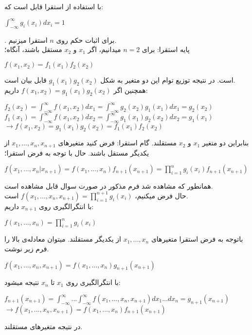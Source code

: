 با استفاده از استقرا قابل است که:
\begin{center}
	$ \int_{-\infty}^{\infty} g_i(x_i) dx_i = 1$
\end{center}
.
برای اثبات حکم روی
$ n $
استقرا میزنیم.
\\
پایه استقرا: برای
$ n = 2 $
میدانیم، اگر
$ x_1 $
و
$ x_2 $
مستقل باشند، آنگاه؛
\begin{center}
	$ f(x_1, x_2) = f_1(x_1) f_2(x_2) $
\end{center}
است. در نتیجه توزیع توام این دو متغیر به شکل 
$ g_1(x_1) g_2(x_2) $
قابل بیان است.
\\
همچنین اگر 
$ f(x_1, x_2) = g_1(x_1) g_2(x_2) $
داریم:
\begin{center}
	$ f_2(x_2) = \int_{-\infty}^{\infty} f(x_1, x_2) dx_1 = \int_{-\infty}^{\infty} g_2(x_2) g_1(x_1) dx_1 = g_2(x_2)$
	\\
	$ f_1(x_1) = \int_{-\infty}^{\infty} f(x_1, x_2) dx_2 = \int_{-\infty}^{\infty} g_1(x_1) g_2(x_2) dx_2 = g_1(x_1)$
	\\
	$ \rightarrow f(x_1, x_2) = g_1(x_1) g_2(x_2) = f_1(x_1) f_2(x_2)$
\end{center}
بنابراین دو متغیر 
$ x_1 $
و
$ x_2 $
مستقلند.
گام استقرا:
فرض کنید متغیرهای
$ x_1,..., x_n, x_{n+1} $
از یکدیگر مستقل باشند.
حال با توجه به فرض استقرا؛
\begin{center}
	$ f(x_1,..., x_n | x_{n+1}) = f(x_1,..., x_n) f_{n+1}(x_{n+1}) = \prod_{i=1}^{n} g_i(x_i) f_{n+1}(x_{n+1})$
\end{center}
همانطور که مشاهده شد فرم مذکور در صورت سوال قابل مشاهده است.
\\
حال فرض میکنیم،
$ f(x_1,..., x_n, x_{n+1}) = \prod_{i=1}^{n+1} g_i(x_i) $
است.
\\
با انتگرالگیری روی 
$ x_{n+1} $
داریم:
\begin{center}
	$ f(x_1,..., x_n) = \prod_{i=1}^{n} g_i(x_i) $
\end{center}
باتوجه به فرض استقرا متغیرهای
$ x_1,..., x_n $
از یکدیگر مستقلند. میتوان معادله‌ی بالا را فرم زیر نوشت.
\begin{center}
	$ f(x_1,..., x_n, x_{n+1}) = f(x_1,..., x_n) g_{n+1}(x_{n+1}) $
\end{center}
با انتگرالگیری روی
$ x_1 $
تا
$ x_n $
نتیجه میشود:
\begin{center}
	$ f_{n+1}(x_{n+1}) = \int_{-\infty}^{\infty} ... \int_{-\infty}^{\infty} f(x_1,..., x_n, x_{n+1}) dx_1 ... dx_n = g_{n+1}(x_{n+1}) $
	\\
	$ \rightarrow f(x_1,..., x_n, x_{n+1}) = f(x_1,..., x_n) f_{n+1}(x_{n+1}) $
\end{center}
در نتیجه متغیرهای مستقلند.